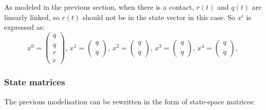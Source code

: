 \documentclass[english,12pt,a4paper]{article}
\begin{document}
			As modeled in the previous section, when there is a contact, $r(t)$ and $q(t)$ are linearly linked, so $r(t)$ should not be in the state vector in this case.
			So $x^i$ is expressed as:
			\begin{equation}
				x^0 = \begin{pmatrix}
					q \\
					\dot{q} \\
					r \\
					\dot{r}
				\end{pmatrix} \text{, }
				x^1 = \begin{pmatrix}
					q \\
					\dot{q}
				\end{pmatrix} \text{, }
				x^2 = \begin{pmatrix}
					q \\
					\dot{q}
				\end{pmatrix} \text{, }
				x^3 = \begin{pmatrix}
					q \\
					\dot{q}
				\end{pmatrix} \text{, }
				x^4 = \begin{pmatrix}
					q \\
					\dot{q}
				\end{pmatrix} \text{, }
			\end{equation}
				
		\subsubsection{State matrices}
			The previous modelisation can be rewritten in the form of state-space matrices:
			
\end{document}
